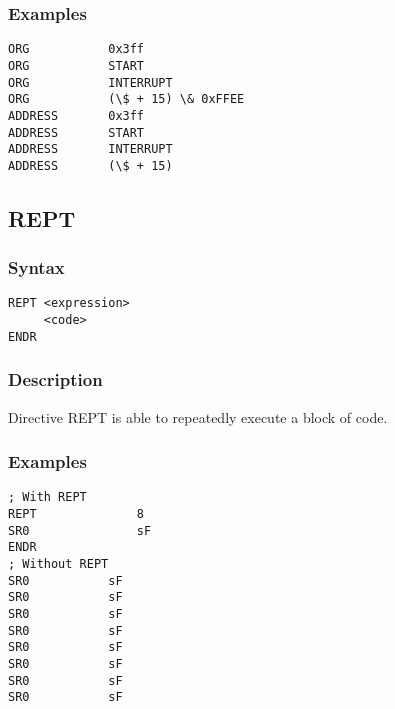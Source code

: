         \subsubsection{Examples}
            \verb'ORG           0x3ff'\\
            \verb'ORG           START'\\
            \verb'ORG           INTERRUPT'\\
            \verb'ORG           (\$ + 15) \& 0xFFEE'\\
            \verb'ADDRESS       0x3ff'\\
            \verb'ADDRESS       START'\\
            \verb'ADDRESS       INTERRUPT'\\
            \verb'ADDRESS       (\$ + 15)'

    \subsection{REPT}
        \subsubsection{Syntax}
            \verb'REPT <expression>'\\
            \verb'     <code>'\\
            \verb'ENDR'

        \subsubsection{Description}
            Directive REPT is able to repeatedly execute a block of code.

        \subsubsection{Examples}
            \verb'; With REPT'\\
            \verb'REPT              8'\\
            \verb'SR0               sF'\\
            \verb'ENDR'\\
            \verb'; Without REPT'\\
            \verb'SR0           sF'\\
            \verb'SR0           sF'\\
            \verb'SR0           sF'\\
            \verb'SR0           sF'\\
            \verb'SR0           sF'\\
            \verb'SR0           sF'\\
            \verb'SR0           sF'\\
            \verb'SR0           sF'

